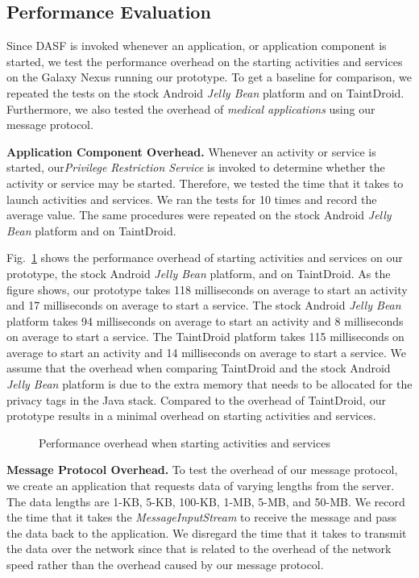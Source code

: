 \subsection{Performance Evaluation}

Since DASF is invoked whenever an application, or application
component is started, we test the performance overhead on the starting
activities and services on the Galaxy Nexus running our prototype.  To get
a baseline for comparison, we repeated the tests on the stock
Android \textit{Jelly Bean} platform and on TaintDroid.  Furthermore,
we also tested the overhead of \textit{medical applications} using our
message protocol. 

\textbf{Application Component Overhead.}  Whenever an activity or
service is started, our\textit{Privilege Restriction Service} is
invoked to determine whether the activity or service may be started.
Therefore, we tested the time that it takes to launch activities and
services.  We ran the tests for 10 times and record the average
value.  The same procedures were repeated on the stock
Android \textit{Jelly Bean} platform and on TaintDroid.  

Fig.~\ref{fig:component} shows the performance overhead of starting
activities and services on our prototype, the stock
Android \textit{Jelly Bean} platform, and on TaintDroid. As the figure
shows, our prototype takes 118 milliseconds on average to start an
activity and 17 milliseconds on average to start a service.  The stock
Android \textit{Jelly Bean} platform takes 94 milliseconds on average
to start an activity and 8 milliseconds on average to start a service.
The TaintDroid platform takes 115 milliseconds on average to start an
activity and 14 milliseconds on average to start a service.  We assume
that the overhead when comparing TaintDroid and the stock
Android \textit{Jelly Bean} platform is due to the extra memory that
needs to be allocated for the privacy tags in the Java stack. 
Compared to the overhead of TaintDroid, our prototype results in
a minimal overhead on starting activities and services. 

\begin{figure}[ht]
\centering
{}
\caption{Performance overhead when starting activities and services}
\label{fig:component}
\end{figure}

\textbf{Message Protocol Overhead.}  To test the overhead of our
message protocol, we create an application that requests data of
varying lengths from the server. The data lengths are 1-KB, 5-KB,
100-KB, 1-MB, 5-MB, and 50-MB. We record the time that it takes
the \textit{MessageInputStream} to receive the message and pass the
data back to the application.  We disregard the time that it takes to
transmit the data over the network since that is related 
to the overhead of the network speed rather than the overhead caused by
our message protocol.  

